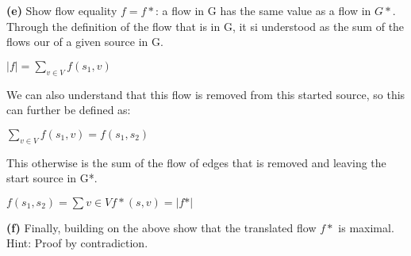 \documentclass[12pt]{article}
\begin{document}
 \textbf{(e)} Show flow equality $f = f*$: a flow in G has the same value as a flow in $G*$. \\
 \linebreak
 Through the definition of the flow that is in G,  it si understood as the sum of the flows our of a given source in G. \\
 \begin{center}
 $\lvert f \rvert = \sum_{v \in V} f(s_1,v)$ \\
 \end{center}
 We can also understand that this flow is removed from this started source, so this can further be defined as: \\
 \begin{center}
 $\sum_{v \in V} f(s_1,v) = f(s_1,s_2)$ \\
 \end{center}
 This otherwise is the sum of the flow of edges that is removed and leaving the start source in G*. \\
 \begin{center}
 $f(s_1,s_2) = \sum{v \in V} f*(s,v) = \lvert f* \rvert$
 \end{center}
 \linebreak
 \textbf{(f)} Finally, building on the above show that the translated flow $f*$ is maximal. Hint: Proof by contradiction. \\
\end{document}
